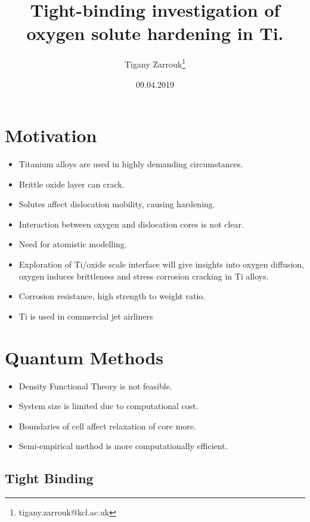 \documentclass[11pt]{article}
\author{Tigany Zarrouk\thanks{tigany.zarrouk@kcl.ac.uk}}
\date{09.04.2019}
\title{Tight-binding investigation of oxygen solute hardening in Ti.}
\begin{document}
\maketitle



\section*{Motivation}
\label{sec:org2e2201b}
\begin{itemize}
\item Titanium alloys are used in highly demanding circumstances.
\item Brittle oxide layer can crack.
\item Solutes affect dislocation mobility, causing hardening.
\item Interaction between oxygen and dislocation cores is not clear.
\item Need for atomistic modelling.
\item Exploration of Ti/oxide scale interface will give insights into oxygen
diffusion, oxygen induces brittleness and stress corrosion cracking in Ti
alloys.
\end{itemize}
\begin{NOTES}
\begin{itemize}
\item Corrosion resistance, high strength to weight ratio.
\item Ti is used in commercial jet airliners
\end{itemize}
\end{NOTES}


\section*{Quantum Methods}
\label{sec:org68014c3}
\begin{itemize}
\item Density Functional Theory is not feasible.
\item System size is limited due to computational cost.
\item Boundaries of cell affect relaxation of core more.
\item Semi-empirical method is more computationally efficient.
\end{itemize}

\subsection*{Tight Binding}
\label{sec:orgf5f45ea}
\end{document}
